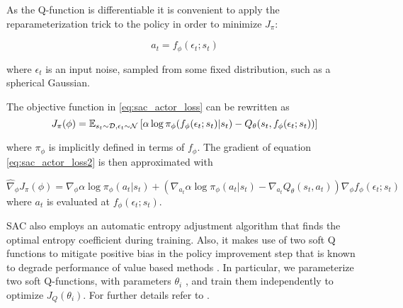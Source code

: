 As the Q-function is differentiable it is convenient to apply the reparameterization trick to the policy in order to minimize $J_\pi$:

\begin{equation*}
    a_t = f_\phi(\epsilon_t; s_t)
\end{equation*}

where $\epsilon_t$ is an input noise, sampled from some fixed distribution, such as a spherical Gaussian.

The objective function in \eqref{eq:sac_actor_loss} can be rewritten as
\begin{equation}
    \label{eq:sac_actor_loss2}
    J_\pi(\phi) = \mathbb{E}_{s_t \sim \mathcal{D}, \epsilon_t \sim \mathcal{N}}\left[\alpha \log{\pi_\phi(f_\phi(\epsilon_t;s_t)|s_t)} - Q_\theta(s_t, f_\phi(\epsilon_t;s_t))\right]
\end{equation}

where $\pi_\phi$ is implicitly defined in terms of $f_\phi$. The gradient of equation \eqref{eq:sac_actor_loss2} is then approximated with

\begin{equation*}
    \hat{\nabla}_\phi J_\pi(\phi) = \nabla_\phi \alpha \log{\pi_\phi(a_t|s_t)} + \left(\nabla_{a_t} \alpha \log{\pi_\phi(a_t|s_t)} - \nabla_{a_t}Q_\theta(s_t, a_t)\right) \nabla_\phi f_\phi(\epsilon_t;s_t)
\end{equation*}
where $a_t$ is evaluated at $f_\phi(\epsilon_t;s_t)$.

SAC also employs an automatic entropy adjustment algorithm that finds the optimal entropy coefficient during training.
Also, it makes use of two soft Q functions to mitigate positive bias in the policy improvement step that is known to degrade performance of value based methods \cite{Hasselt2010, Fujimoto2018}.
In particular, we parameterize two soft Q-functions, with parameters $\theta_i$ , and train them independently to optimize $J_Q(\theta_i)$.
For further details refer to \cite{SAC_modified}.



